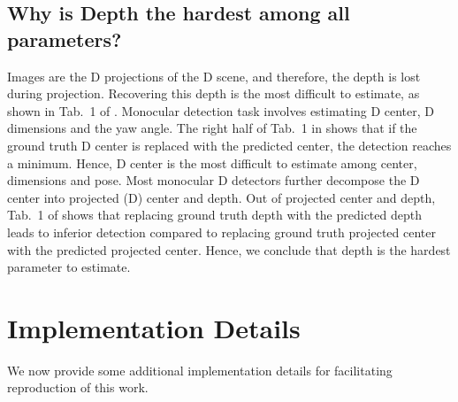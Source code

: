 \documentclass[runningheads]{llncs}
\newcommand{\twoD}{D}
\newcommand{\threeD}{D}
\begin{document}
\subsection{Why is Depth the hardest among all parameters?}
        Images are the \twoD{} projections of the \threeD{} scene, and therefore, the depth is lost during projection.
        Recovering this depth is the most difficult to estimate, as shown in Tab.~1 of \cite{ma2021delving}.
        Monocular detection task involves estimating \threeD{} center, \threeD{} dimensions and the yaw angle. 
        The right half of Tab.~1 in \cite{ma2021delving} shows that if the ground truth \threeD{} center is replaced with the predicted center, the detection reaches a minimum. 
        Hence, \threeD{} center is the most difficult to estimate among center, dimensions and pose.
        Most monocular \threeD{} detectors further decompose the \threeD{} center into projected (\twoD{}) center and depth. 
        Out of projected center and depth, Tab.~1 of \cite{ma2021delving} shows that replacing ground truth depth with the predicted depth leads to inferior detection compared to replacing ground truth projected center with the predicted projected center.
        Hence, we conclude that depth is the hardest parameter to estimate.
        

\clearpage
\section{Implementation Details}\label{sec:implement_details}
    We now provide some additional implementation details for facilitating reproduction of this work.
\end{document}
